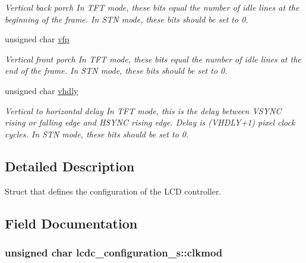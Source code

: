 \begin{CompactItemize}
\begin{CompactList}\small\item\em Vertical back porch In TFT mode, these bits equal the number of idle lines at the beginning of the frame. In STN mode, these bits should be set to 0. \item\end{CompactList}\item 
\hypertarget{structlcdc__configuration__s_84d32f91e79f6b962458a4b7ee7cff14}{
unsigned char \hyperlink{structlcdc__configuration__s_84d32f91e79f6b962458a4b7ee7cff14}{vfp}}
\label{structlcdc__configuration__s_84d32f91e79f6b962458a4b7ee7cff14}

\begin{CompactList}\small\item\em Vertical front porch In TFT mode, these bits equal the number of idle lines at the end of the frame. In STN mode, these bits should be set to 0. \item\end{CompactList}\item 
\hypertarget{structlcdc__configuration__s_1f0be879ae9be791ef1891b9bf58001c}{
unsigned char \hyperlink{structlcdc__configuration__s_1f0be879ae9be791ef1891b9bf58001c}{vhdly}}
\label{structlcdc__configuration__s_1f0be879ae9be791ef1891b9bf58001c}

\begin{CompactList}\small\item\em Vertical to horizontal delay In TFT mode, this is the delay between VSYNC rising or falling edge and HSYNC rising edge. Delay is (VHDLY+1) pixel clock cycles. In STN mode, these bits should be set to 0. \item\end{CompactList}\end{CompactItemize}


\subsection{Detailed Description}
Struct that defines the configuration of the LCD controller. 

\subsection{Field Documentation}
\hypertarget{structlcdc__configuration__s_399605434d25fa42df8f7d5142a93b9e}{
\subsubsection[{clkmod}]{\setlength{\rightskip}{0pt plus 5cm}unsigned char {\bf lcdc\_\-configuration\_\-s::clkmod}}}
\label{structlcdc__configuration__s_399605434d25fa42df8f7d5142a93b9e}


